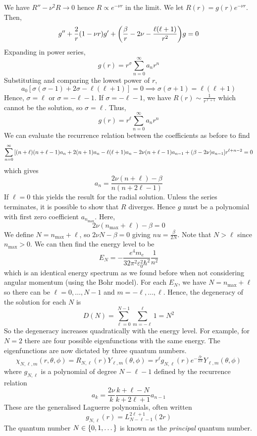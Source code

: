 We have \( R'' - \nu^2 R \to 0 \) hence \( R \propto e^{-\nu r} \) in the limit.
We let \( R(r) = g(r) e^{-\nu r} \).
Then,
\[
	g'' + \frac{2}{r} (1 - \nu r) g' + \qty(\frac{\beta}{r} - 2 \nu - \frac{\ell(\ell+1)}{r^2}) g = 0
\]
Expanding in power series,
\[
	g(r) = r^\sigma \sum_{n=0}^\infty a_n r^n
\]
Substituting and comparing the lowest power of \( r \),
\[
	a_0 [ \sigma (\sigma - 1) + 2 \sigma - \ell(\ell + 1) ] = 0 \implies \sigma(\sigma + 1) = \ell(\ell + 1)
\]
Hence, \( \sigma = \ell \) or \( \sigma = -\ell - 1 \).
If \( \sigma = -\ell - 1 \), we have \( R(r) \sim \frac{1}{r^{\ell + 1}} \) which cannot be the solution, so \( \sigma = \ell \).
Thus,
\[
	g(r) = r^\ell \sum_{n=0}^\infty a_n r^n
\]
We can evaluate the recurrence relation between the coefficients as before to find
\[
	\sum_{n=0}^\infty \qty[(n+\ell)(n+\ell - 1)a_n + 2(n+1)a_n - \ell(\ell+1)a_n - 2 \nu(n+\ell - 1) a_{n-1} + (\beta - 2\nu) a_{n-1}] r^{\ell + n - 2} = 0
\]
which gives
\[
	a_n = \frac{2\nu(n+\ell) - \beta}{n(n+2\ell - 1)}
\]
If \( \ell = 0 \) this yields the result for the radial solution.
Unless the series terminates, it is possible to show that \( R \) diverges.
Hence \( g \) must be a polynomial with first zero coefficient \( a_{n_{\max}} \).
Here,
\[
	2\nu(n_{\max} + \ell) - \beta = 0
\]
We define \( N = n_{\max} + \ell \), so \( 2 \nu N - \beta = 0 \) giving \( nu = \frac{\beta}{2N} \).
Note that \( N > \ell \) since \( n_{\max} > 0 \).
We can then find the energy level to be
\[
	E_N = -\frac{e^4 m_e}{32 \pi^2 \varepsilon_0^2 \hbar^2} \frac{1}{n^2}
\]
which is an identical energy spectrum as we found before when not considering angular momentum (using the Bohr model).
For each \( E_N \), we have \( N = n_{\max} + \ell \) so there can be \( \ell = 0, \dots, N-1 \) and \( m = -\ell, \dots, \ell \).
Hence, the degeneracy of the solution for each \( N \) is
\[
	D(N) = \sum_{\ell=0}^{N-1} \sum_{m=-\ell}^\ell 1 = N^2
\]
So the degeneracy increases quadratically with the energy level.
For example, for \( N = 2 \) there are four possible eigenfunctions with the same energy.
The eigenfunctions are now dictated by three quantum numbers.
\[
	\chi_{N,\ell,m}(r,\theta,\phi) = R_{N,\ell}(r)Y_{\ell,m}(\theta,\phi) = r^\ell g_{N,\ell}(r) e^{-\frac{\beta r}{2N}} Y_{\ell,m}(\theta,\phi)
\]
where \( g_{N,\ell} \) is a polynomial of degree \( N - \ell - 1 \) defined by the recurrence relation
\[
	a_k = \frac{2\nu}{k} \frac{k + \ell - N}{k + 2\ell + 1} a_{n-1}
\]
These are the generalised Laguerre polynomials, often written
\[
	g_{N,\ell}(r) = L_{N - \ell - 1}^{2\ell + 1}(2r)
\]
The quantum number \( N \in \qty{0, 1, \dots} \) is known as the \textit{principal} quantum number.

